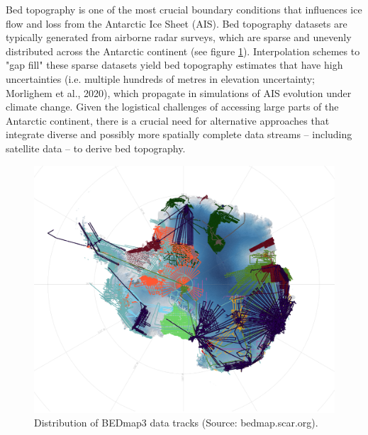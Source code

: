 Bed topography is one of the most crucial boundary conditions that influences ice flow and loss from the Antarctic Ice Sheet (AIS)\cite{Morlighem_2020}. Bed topography datasets are typically generated from airborne radar surveys, which are sparse and unevenly distributed across the Antarctic continent (see figure \ref{fig:BEDmap}). Interpolation schemes to "gap fill" these sparse datasets yield bed topography estimates that have high uncertainties (i.e. multiple hundreds of metres in elevation uncertainty; Morlighem et al., 2020), which propagate in simulations of AIS evolution under climate change\cite{Castleman_2022}. Given the logistical challenges of accessing large parts of the Antarctic continent, there is a crucial need for alternative approaches that integrate diverse and possibly more spatially complete data streams – including satellite data – to derive bed topography.
\begin{figure}[H]    %
    \includegraphics[scale=0.45]{BEDmap3.png}
    \caption{Distribution of BEDmap3 data tracks (Source: bedmap.scar.org).}
    \label{fig:BEDmap}
\end{figure}

